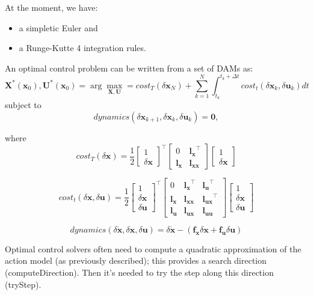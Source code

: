 At the moment, we have:
\begin{itemize}
\item a simpletic Euler and
\item a Runge-Kutte 4 integration rules.
\end{itemize}

An optimal control problem can be written from a set of DAMs as:
$$\mathbf{X}^*(\mathbf{x}_0),\mathbf{U}^*(\mathbf{x}_0)
=
\arg\max_{\mathbf{X},\mathbf{U}} = cost_T(\delta\mathbf{x}_N) + \sum_{k=1}^N \int_{t_k}^{t_k+\Delta t} cost_t(\delta\mathbf{x}_k, \delta\mathbf{u}_k) dt$$
subject to
$$dynamics(\delta\mathbf{x}_{k+1},\delta\mathbf{x}_k,\delta\mathbf{u}_k)=\mathbf{0},$$

where
$$cost_T(\delta\mathbf{x}) = \frac{1}{2}
\begin{bmatrix} 
  1 \\ \delta\mathbf{x}
\end{bmatrix}^\top
\begin{bmatrix}
0 & \mathbf{l_x}^\top \\
\mathbf{l_x} & \mathbf{l_{xx}}
\end{bmatrix}
\begin{bmatrix}
  1 \\ \delta\mathbf{x}
\end{bmatrix}
$$

$$cost_t(\delta\mathbf{x},\delta\mathbf{u}) = \frac{1}{2}
\begin{bmatrix} 
  1 \\ \delta\mathbf{x} \\ \delta\mathbf{u}
\end{bmatrix}^\top
\begin{bmatrix}
0 & \mathbf{l_x}^\top & \mathbf{l_u}^\top\\
\mathbf{l_x} & \mathbf{l_{xx}} & \mathbf{l_{ux}}^\top\\
\mathbf{l_u} & \mathbf{l_{ux}} & \mathbf{l_{uu}}
\end{bmatrix}
\begin{bmatrix}
  1 \\ \delta\mathbf{x} \\ \delta\mathbf{u}
\end{bmatrix}
$$

$$
dynamics(\delta\mathbf{\dot{x}},\delta\mathbf{x},\delta\mathbf{u}) = \delta\mathbf{\dot{x}} - (\mathbf{f_x}\delta\mathbf{x} + \mathbf{f_u}\delta\mathbf{u})
$$

Optimal control solvers often need to compute a quadratic approximation of the action model (as previously described); this provides a search direction (computeDirection). Then it's needed to try the step along this direction (tryStep).

